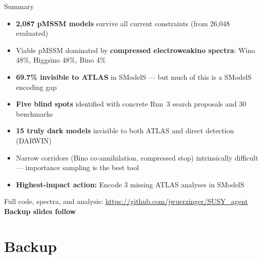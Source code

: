 \documentclass[aspectratio=169,10pt]{beamer}
\begin{document}
\begin{frame}{Summary}
\begin{itemize}
  \item \textbf{2,087 pMSSM models} survive all current constraints (from 26,048 evaluated)
  \item Viable pMSSM dominated by \textbf{compressed electroweakino spectra}: Wino 48\%, Higgsino 48\%, Bino 4\%
  \item \textbf{69.7\% invisible to ATLAS} in SModelS --- but much of this is a SModelS encoding gap
  \item \textbf{Five blind spots} identified with concrete Run~3 search proposals and 30 benchmarks
  \item \textbf{15 truly dark models} invisible to both ATLAS and direct detection (DARWIN)
  \item Narrow corridors (Bino co-annihilation, compressed stop) intrinsically difficult --- importance sampling is the best tool
  \item \textbf{Highest-impact action:} Encode 3 missing ATLAS analyses in SModelS
\end{itemize}

\vspace{0.5em}
\begin{center}
{\small Full code, spectra, and analysis: \url{https://github.com/jwuerzinger/SUSY_agent}}\\[0.8em]
\large\textbf{Backup slides follow}
\end{center}
\end{frame}

\appendix
\section*{Backup}
\end{document}
